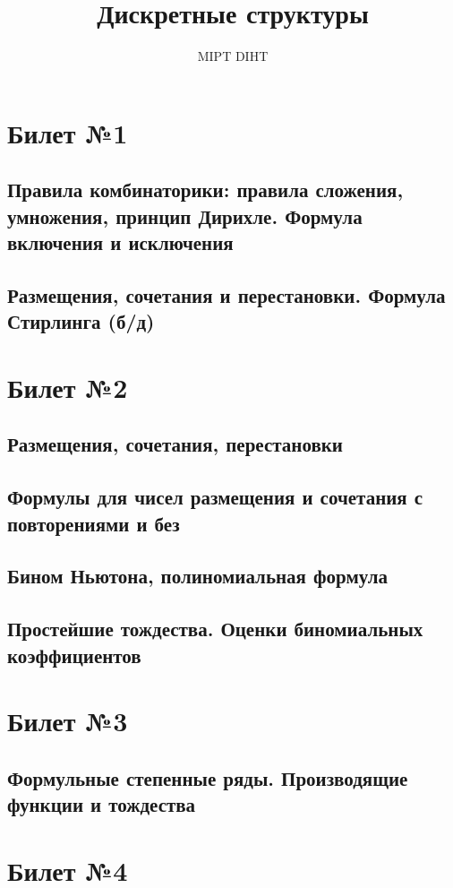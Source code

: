 \documentclass[a4paper]{article}
\title{Дискретные структуры}
\author{MIPT DIHT}
\theoremstyle{plain}
\theoremstyle{remark}
\theoremstyle{definition}
\begin{document}
\maketitle

\section{Билет №1}
\subsection{Правила комбинаторики: правила сложения, умножения, принцип Дирихле. Формула включения и исключения}
\subsection{Размещения, сочетания и перестановки. Формула Стирлинга (б/д)}

\section{Билет №2}
\subsection{Размещения, сочетания, перестановки}
\subsection{Формулы для чисел размещения и сочетания с повторениями и без}
\subsection{Бином Ньютона, полиномиальная формула}
\subsection{Простейшие тождества. Оценки биномиальных коэффициентов}

\section{Билет №3}
\subsection{Формульные степенные ряды. Производящие функции и тождества}

\section{Билет №4}
\end{document}
